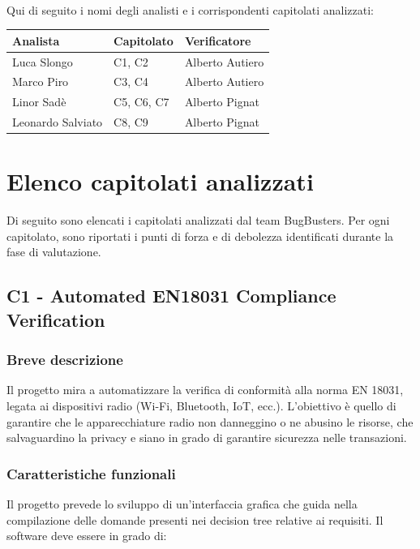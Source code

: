 \documentclass[a4paper,11pt]{article}
\begin{document}
\paragraph{}
Qui di seguito i nomi degli analisti e i corrispondenti capitolati analizzati:

\begin{tabularx}{\textwidth}{|X|X|X|}
\hline
\rowcolor{lightgray!40}
\textbf{Analista} & \textbf{Capitolato} & \textbf{Verificatore} \\
\hline
Luca Slongo & C1, C2 & Alberto Autiero\\ 
\hline
Marco Piro & C3, C4 & Alberto Autiero \\ 
\hline
Linor Sadè & C5, C6, C7 & Alberto Pignat\\ 
\hline
Leonardo Salviato & C8, C9 & Alberto Pignat\\ 
\hline
\end{tabularx}

\newpage
\section{Elenco capitolati analizzati}
Di seguito sono elencati i capitolati analizzati dal team BugBusters. Per ogni capitolato, sono riportati i punti di forza e di debolezza identificati durante la fase di valutazione.

\newpage
\subsection{C1 - Automated EN18031 Compliance Verification}
\subsubsection{Breve descrizione}
Il progetto mira a automatizzare la verifica di conformità alla norma EN 18031, legata ai dispositivi radio (Wi-Fi, Bluetooth, IoT, ecc.). L'obiettivo è quello di garantire che le apparecchiature radio non danneggino o ne abusino le risorse, che salvaguardino la privacy e siano in grado di garantire sicurezza nelle transazioni.
\subsubsection{Caratteristiche funzionali}
Il progetto prevede lo sviluppo di un'interfaccia grafica che guida nella compilazione delle domande presenti nei decision tree relative ai requisiti.  
Il software deve essere in grado di:
\end{document}

